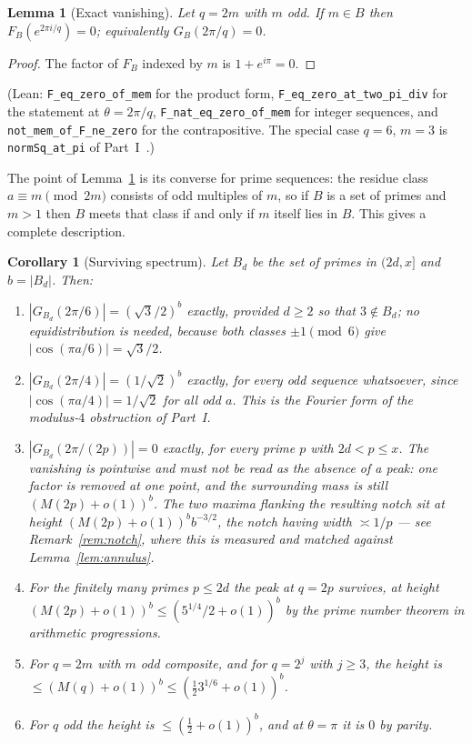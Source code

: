 \documentclass[11pt,a4paper]{article}
\theoremstyle{plain}
\newtheorem{lemma}[theorem]{Lemma}
\newtheorem{corollary}[theorem]{Corollary}
\theoremstyle{definition}
\theoremstyle{remark}
\newcommand{\Lean}[1]{\texttt{#1}}
\begin{document}
\begin{lemma}[Exact vanishing]\label{lem:vanish}
Let $q=2m$ with $m$ odd. If $m\in B$ then $F_B(e^{2\pi i/q})=0$; equivalently
$G_B(2\pi/q)=0$.
\end{lemma}

\begin{proof}
The factor of $F_B$ indexed by $m$ is $1+e^{i\pi}=0$.
\end{proof}

\noindent
(Lean: \Lean{F\_eq\_zero\_of\_mem} for the product form, \Lean{F\_eq\_zero\_at\_two\_pi\_div}
for the statement at $\theta=2\pi/q$, \Lean{F\_nat\_eq\_zero\_of\_mem} for integer
sequences, and \Lean{not\_mem\_of\_F\_ne\_zero} for the contrapositive. The
special case $q=6$, $m=3$ is \Lean{normSq\_at\_pi} of Part~I~\cite{P1}.)

The point of Lemma~\ref{lem:vanish} is its converse for prime sequences: the
residue class $a\equiv m\pmod{2m}$ consists of odd multiples of $m$, so if $B$
is a set of primes and $m>1$ then $B$ meets that class if and only if $m$ itself
lies in $B$. This gives a complete description.

\begin{corollary}[Surviving spectrum]\label{cor:spectrum}
Let $B_d$ be the set of primes in $(2d,x]$ and $b=|B_d|$. Then:
\begin{enumerate}
\item $|G_{B_d}(2\pi/6)|=(\sqrt3/2)^{b}$ \emph{exactly}, provided $d\ge2$ so that
      $3\notin B_d$; no equidistribution is needed, because both classes
      $\pm1\pmod 6$ give $|\cos(\pi a/6)|=\sqrt3/2$.
\item $|G_{B_d}(2\pi/4)|=(1/\sqrt2)^{b}$ \emph{exactly}, for every odd sequence
      whatsoever, since $|\cos(\pi a/4)|=1/\sqrt2$ for all odd $a$. This is the
      Fourier form of the modulus-$4$ obstruction of Part~I.
\item $|G_{B_d}(2\pi/(2p))|=0$ exactly, for every prime $p$ with $2d<p\le x$.
      The vanishing is \emph{pointwise} and must not be read as the absence of a
      peak: one factor is removed at one point, and the surrounding mass is
      still $(M(2p)+o(1))^{b}$. The two maxima flanking the resulting notch sit
      at height $(M(2p)+o(1))^{b}b^{-3/2}$, the notch having width $\asymp1/p$
      --- see Remark~\ref{rem:notch}, where this is measured and matched against
      Lemma~\ref{lem:annulus}.
\item For the finitely many primes $p\le 2d$ the peak at $q=2p$ survives, at
      height $(M(2p)+o(1))^{b}\le(5^{1/4}/2+o(1))^{b}$ by the prime number
      theorem in arithmetic progressions.
\item For $q=2m$ with $m$ odd composite, and for $q=2^{j}$ with $j\ge3$, the
      height is $\le(M(q)+o(1))^{b}\le(\tfrac12 3^{1/6}+o(1))^{b}$.
\item For $q$ odd the height is $\le(\tfrac12+o(1))^{b}$, and at $\theta=\pi$ it
      is $0$ by parity.
\end{enumerate}
\end{corollary}
\end{document}
